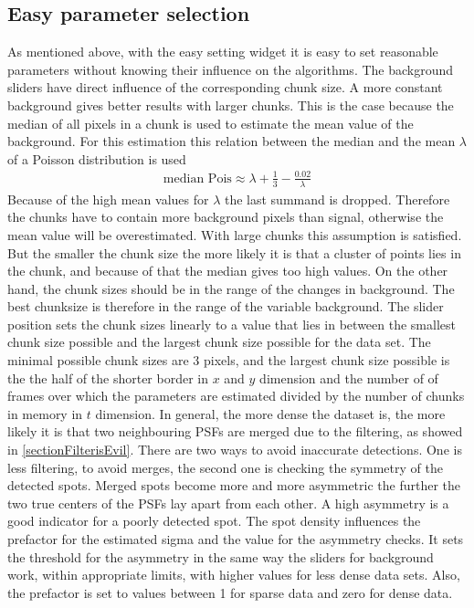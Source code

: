 \subsection{Easy parameter selection}
As mentioned above, with the easy setting widget it is easy to set reasonable parameters without knowing their influence on the algorithms.\newline
The background sliders have direct influence of the corresponding chunk size. A more constant background gives better results with larger chunks. This is the case because the median of all pixels in a chunk is used to estimate the mean value of the background. For this estimation this relation between the median and the mean $\lambda$ of a Poisson distribution is used
\begin{align}
\text{median Pois} \approx \lambda +\frac{1}{3} - \frac{0.02}{\lambda}
\end{align}
Because of the high mean values for $\lambda$ the last summand is dropped.
Therefore the chunks have to contain more background pixels than signal, otherwise the mean value will be overestimated. With large chunks this assumption is satisfied. But the smaller the chunk size the more likely it is that a cluster of points lies in the chunk, and because of that the median gives too high values. On the other hand, the chunk sizes should be in the range of the changes in background. The best chunksize is therefore in the range of the variable background. The slider position sets the chunk sizes linearly to a value that lies in between the smallest chunk size possible and the largest chunk size possible for the data set. The minimal possible chunk sizes are 3 pixels, and the largest chunk size possible is the the half of the shorter border in $x$ and $y$ dimension and the number of of frames over which the parameters are estimated divided by the number of chunks in memory in $t$ dimension.\newline 
In general, the more dense the dataset is, the more likely it is that two neighbouring PSFs are merged due to the filtering, as showed in \ref{sectionFilterisEvil}. There are two ways to avoid inaccurate detections. One is less filtering, to avoid merges, the second one is checking the symmetry of the detected spots. Merged spots become more and more asymmetric the further the two true centers of the PSFs lay apart from each other. A high asymmetry is a good indicator for a poorly detected spot.
The spot density influences the prefactor for the estimated sigma and the value for the asymmetry checks. It sets the threshold for the asymmetry in the same way the sliders for background work, within appropriate limits, with higher values for less dense data sets. Also, the prefactor is set to values between 1 for sparse data and zero for dense data.
